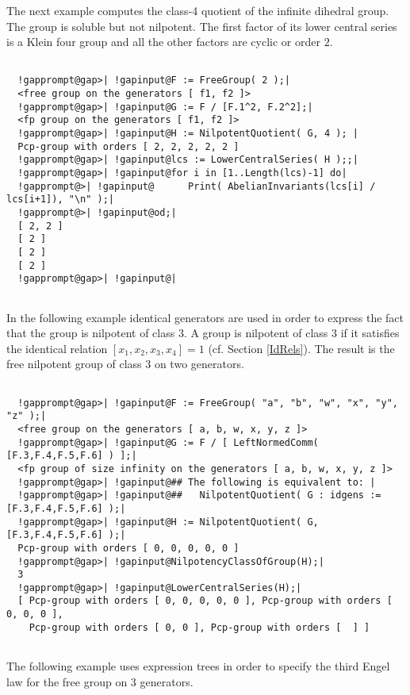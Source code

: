 \documentclass[a4paper,11pt]{report}
\begin{document}
{{{The next example computes the class-4 quotient of the infinite dihedral group.
The group is soluble but not nilpotent. The first factor of its lower central
series is a Klein four group and all the other factors are cyclic or order $2$. 
\begin{Verbatim}[commandchars=!@|,fontsize=\small,frame=single,label=Example]
  
  !gapprompt@gap>| !gapinput@F := FreeGroup( 2 );|
  <free group on the generators [ f1, f2 ]>
  !gapprompt@gap>| !gapinput@G := F / [F.1^2, F.2^2];|
  <fp group on the generators [ f1, f2 ]>
  !gapprompt@gap>| !gapinput@H := NilpotentQuotient( G, 4 ); |
  Pcp-group with orders [ 2, 2, 2, 2, 2 ]
  !gapprompt@gap>| !gapinput@lcs := LowerCentralSeries( H );;|
  !gapprompt@gap>| !gapinput@for i in [1..Length(lcs)-1] do|
  !gapprompt@>| !gapinput@      Print( AbelianInvariants(lcs[i] / lcs[i+1]), "\n" );|
  !gapprompt@>| !gapinput@od;|
  [ 2, 2 ]
  [ 2 ]
  [ 2 ]
  [ 2 ]
  !gapprompt@gap>| !gapinput@|
  
\end{Verbatim}
 In the following example identical generators are used in order to express the
fact that the group is nilpotent of class $3$. A group is nilpotent of class $3$ if it satisfies the identical relation $[x_1,x_2,x_3,x_4]=1$ (cf. Section \ref{IdRels}). The result is the free nilpotent group of class $3$ on two generators. 
\begin{Verbatim}[commandchars=!@|,fontsize=\small,frame=single,label=Example]
  
  !gapprompt@gap>| !gapinput@F := FreeGroup( "a", "b", "w", "x", "y", "z" );|
  <free group on the generators [ a, b, w, x, y, z ]>
  !gapprompt@gap>| !gapinput@G := F / [ LeftNormedComm( [F.3,F.4,F.5,F.6] ) ];|
  <fp group of size infinity on the generators [ a, b, w, x, y, z ]>
  !gapprompt@gap>| !gapinput@## The following is equivalent to: |
  !gapprompt@gap>| !gapinput@##   NilpotentQuotient( G : idgens := [F.3,F.4,F.5,F.6] );|
  !gapprompt@gap>| !gapinput@H := NilpotentQuotient( G, [F.3,F.4,F.5,F.6] );|
  Pcp-group with orders [ 0, 0, 0, 0, 0 ]
  !gapprompt@gap>| !gapinput@NilpotencyClassOfGroup(H);|
  3
  !gapprompt@gap>| !gapinput@LowerCentralSeries(H);|
  [ Pcp-group with orders [ 0, 0, 0, 0, 0 ], Pcp-group with orders [ 0, 0, 0 ], 
    Pcp-group with orders [ 0, 0 ], Pcp-group with orders [  ] ]
  
\end{Verbatim}
 The following example uses expression trees in order to specify the third
Engel law for the free group on $3$ generators. 
\begin{Verbatim}[commandchars=!@|,fontsize=\small,frame=single,label=Example]
  

\end{Verbatim}}}}
\end{document}
